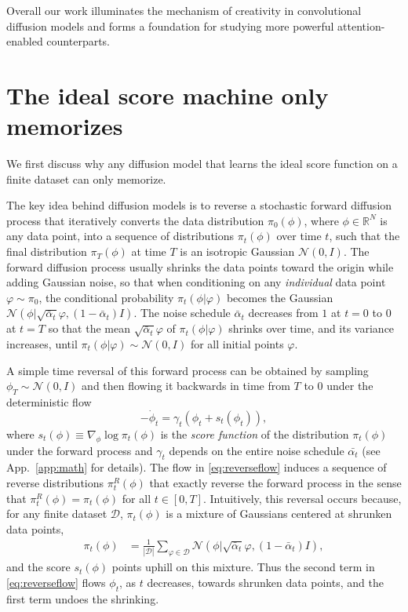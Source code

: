 \documentclass{article}
\theoremstyle{plain}
\theoremstyle{definition}
\theoremstyle{remark}
\begin{document}
Overall our work illuminates the mechanism of creativity in convolutional diffusion models and forms a foundation for studying more powerful attention-enabled counterparts.




\section{The ideal score machine only memorizes}
\label{sec:ideal_score}

We first discuss why any diffusion model that learns the ideal score function on a finite dataset can only memorize.   

The key idea behind diffusion models is to reverse a stochastic forward diffusion process that iteratively converts the data distribution $\pi_0(\phi)$, where $\phi \in \mathbb R^N$ is any data point, into a sequence of distributions $\pi_t(\phi)$ over time $t$, such that the final distribution $\pi_T(\phi)$ at time $T$ is an isotropic Gaussian $\mathcal{N}(0,I)$. The forward diffusion process usually shrinks the data points toward the origin while adding Gaussian noise, so that when conditioning on any {\it individual} data point $\varphi \sim \pi_0$, the conditional probability $\pi_t(\phi | \varphi)$ becomes the Gaussian $\mathcal{N}(\phi| \sqrt{\bar{\alpha}_t} \varphi, (1 - \bar{\alpha}_t ) I)$. The noise schedule $\bar{\alpha}_t$ decreases from $1$ at $t=0$ to $0$ at $t=T$ so that
the mean $\sqrt{\bar{\alpha}_t} \varphi$ of $\pi_t(\phi | \varphi)$ shrinks over time, and its variance increases, until $\pi_t(\phi | \varphi) \sim \mathcal{N}(0,I)$ for all initial points $\varphi$.   

A simple time reversal of this forward process can be obtained by sampling $\phi_T \sim \mathcal{N}(0,I)$ and then flowing it backwards in time from $T$ to $0$ under the deterministic flow
\begin{equation}
    -\dot{\phi} _t= \gamma_t(\phi_t + s_t(\phi_t)),
    \label{eq:reverseflow}
\end{equation}
where $s_t(\phi) \equiv \nabla_\phi \log \pi_t(\phi)$ is the {\it score function} of the distribution $\pi_t(\phi)$ under the forward process and $\gamma_t$ depends on the entire noise schedule $\bar{\alpha_t}$ (see App.~\ref{app:math} for details).  The flow in \eqref{eq:reverseflow} induces a sequence of reverse distributions $\pi^R_t(\phi)$ that exactly reverse the forward process in the sense that $\pi^R_t(\phi) = \pi_t(\phi)$ for all $t\in[0,T]$. Intuitively, this reversal occurs because, for any finite dataset $\mathcal D$, $\pi_t(\phi)$ is a mixture of Gaussians centered at shrunken data points, 
\begin{align}
    \pi_t(\phi) &= \frac{1}{|\mathcal{D}|} \sum_{\varphi \in \mathcal{D}} \mathcal{N}(\phi|\sqrt{\bar{\alpha}_t} \varphi, (1 - \bar{\alpha}_t)I),
    \label{eq:gaussmix}
\end{align}
and the score $s_t(\phi)$ points uphill on this mixture.  Thus the second term in \eqref{eq:reverseflow} flows $\phi_t$, as $t$ decreases, towards shrunken data points, and the first term undoes the shrinking.  
\end{document}
